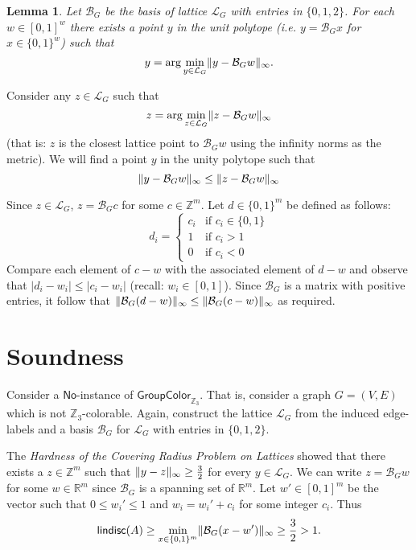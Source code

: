 \documentclass{article}
\newtheorem{lemma}[theorem]{Lemma}
\def\QED{\ensuremath{{\square}}}
\def\markatright#1{\leavevmode\unskip\nobreak\quad\hspace*{\fill}{#1}}
\newenvironment{proof}
  {\begin{trivlist}\item[\hskip\labelsep{\bf Proof.}]}
  {\markatright{\QED}\end{trivlist}}
\DeclarePairedDelimiter\norm{\parallel}{\parallel}
\newcommand\SetL{\mathcal{L}}
\newcommand\B{\mathcal{B}}
\newcommand\R{\mathbb{R}}
\newcommand\Z{\mathbb{Z}}
\newcommand\lindisc{\mathsf{lindisc}}
\newcommand\GroupColor{\mathsf{GroupColor}}
\newcommand\No{\mathsf{No}}
\begin{document}
\begin{lemma}
\label{lem:closestptisunit} Let $\B_{G}$ be the basis of lattice $\SetL_G$ with entries in $\{0,1,2\}$. For each $w \in [0,1]^{w}$ there exists a point $y$ in the unit polytope (i.e. $y = \B_Gx$ for $x \in \{0,1\}^{w}$) such that
\[y = \arg\min_{y \in \SetL_G} \norm{y - \B_Gw}_{\infty}.\] 
\end{lemma}
\begin{proof}
Consider any $z \in \SetL_G$ such that
\[z = \arg\min_{z \in \SetL_G} \norm{z - \B_Gw}_{\infty}\]
(that is: $z$ is the closest lattice point to $\B_Gw$ using the infinity norms as the metric). We will find a point $y$ in the unity polytope such that
\[\norm{y - \B_Gw}_{\infty} \leq \norm{z - \B_Gw}_{\infty}\]

Since $z \in \SetL_G$, $z = \B_Gc$ for some $c \in \Z^{m}$. Let $d \in \{0,1\}^{m}$ be defined as follows:
\[d_i = \begin{cases}
c_i &\mbox{if } c_i \in \{0,1\}\\
1 &\mbox{if } c_i > 1\\
0 &\mbox{if } c_i < 0
\end{cases}\]
Compare each element of $c-w$ with the associated element of $d-w$ and observe that $|d_i - w_i| \leq |c_i - w_i|$ (recall: $w_i \in [0,1]$). Since $\B_G$ is a matrix with positive entries, it follow that $\norm{\B_G(d - w)}_{\infty} \leq \norm{\B_G(c - w)}_{\infty}$ as required.   
\end{proof}

\section{Soundness}
Consider a $\No$-instance of $\GroupColor_{\Z_3}$. That is, consider a graph $G = (V, E)$ which is not $\Z_3$-colorable. Again, construct the lattice $\SetL_G$ from the induced edge-labels and a basis $\B_G$ for $\SetL_G$ with entries in $\{0,1,2\}$. 

The \emph{Hardness of the Covering Radius Problem on Lattices} \cite{haviv2006hardness} showed that there exists a $z \in \Z^m$ such that $\norm{y - z}_{\infty} \geq \frac{3}{2}$ for every $y \in \SetL_G$. We can write $z = \B_Gw$ for some $w \in \R^{m}$ since $\B_G$ is a spanning set of $\R^{m}$. Let $w' \in [0,1]^{m}$ be the vector such that $0 \leq w_i' \leq 1$ and $w_i = w_i' + c_i$ for some integer $c_i$. Thus 
\[\lindisc(A) \geq \min_{x\in \{0,1\}^{m}} \norm{\B_G(x - w')}_{\infty} \geq \frac{3}{2} > 1.\]  

{}

\end{document}
